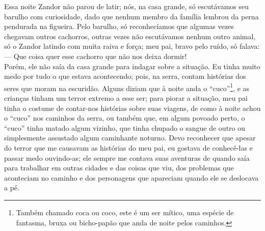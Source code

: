 Essa noite Zandor não parou de latir; nós, na casa grande, só escutávamos seu barulho com curiosidade, dado que nenhum membro da família lembrou da perna pendurada na figueira. 
Pelo barulho, só reconhecíamos que algumas vezes chegavam outros cachorros, outras vezes não escutávamos nenhum outro animal, só o Zandor latindo com muita raiva e força; meu pai, bravo pelo ruído, só falava:\\\indent
--- Que coisa quer esse cachorro que não nos deixa dormir!\\\indent
Porém, ele não saía da casa grande para indagar sobre a situação. 
Eu tinha muito medo por tudo o que estava acontecendo; pois, na serra, contam histórias dos seres que moram na escuridão. 
Alguns diziam que à noite anda o ``cuco''\footnote{Também chamado coca ou coco, este é um ser mítico, uma espécie de fantasma, bruxa ou bicho-papão que anda de noite pelos caminhos.}, e as crianças tinham um terror extremo a esse ser; para piorar a situação, meu pai tinha o costume de contar-nos histórias sobre suas viagens, de como à noite achou o ``cuco'' nos caminhos da serra, ou também que, em algum povoado perto, o ``cuco'' tinha matado algum vizinho, que tinha chupado o sangue de outro ou simplesmente assustado algum caminhante noturno. Devo reconhecer que apesar do terror que me causavam as histórias do meu pai, eu gostava de conhecê-las e passar medo ouvindo-as; ele sempre me contava suas aventuras de quando saía para trabalhar em outras cidades e das coisas que viu, dos problemas que aconteciam no caminho e dos personagens que apareciam quando ele se deslocava a pé.

